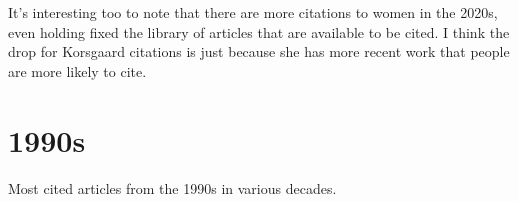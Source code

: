\documentclass[
  10pt,
  letterpaper,
  DIV=11,
  numbers=noendperiod,
  twoside]{scrartcl}
\begin{document}
It's interesting too to note that there are more citations to women in
the 2020s, even holding fixed the library of articles that are available
to be cited. I think the drop for Korsgaard citations is just because
she has more recent work that people are more likely to cite.

\section{1990s}\label{s-2}

\begin{table}

\caption{\label{tbl-articles-1990s}Most cited articles from the 1990s in
various decades.}

\begin{minipage}{0.25\linewidth}


\centering{

}
\end{minipage}
\end{table}
\end{document}
